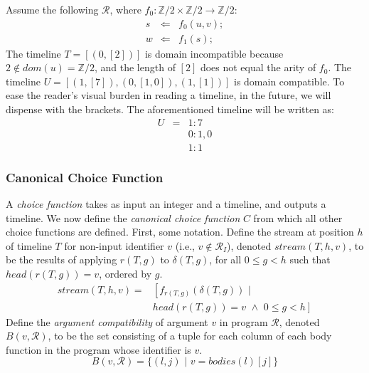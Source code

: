 \begin{example}
Assume the following $\mathcal{R}$, where $f_0 : \mathbb{Z}/2 \times \mathbb{Z}/2 \rightarrow \mathbb{Z}/2$:
\begin{eqnarray*}
  s &\Leftarrow& f_0(u, v); \\
  w &\Leftarrow& f_1(s);
\end{eqnarray*}
The timeline $T = [(0, [2])]$ is domain incompatible because $2 \not\in dom(u) = \mathbb{Z}/2$, and the length of $[2]$ does not equal the arity of $f_0$.  The timeline $U = [(1,[7]), (0,[1,0]), (1,[1])]$ is domain compatible.  To ease the reader's visual burden in reading a timeline, in the future, we will dispense with the brackets.  The aforementioned timeline will be written as:
\begin{eqnarray*}
U & = & 1 : 7 \\
 		&		& 0 : 1, 0 \\
		&		& 1 : 1
\end{eqnarray*}

\end{example}

\subsubsection{Canonical Choice Function}

A {\em choice function} takes as input an integer and a timeline, and outputs a timeline.  We now define the {\em canonical choice function} $C$ from which all other choice functions are defined.  First, some notation.  
Define the stream at position $h$ of timeline $T$ for non-input identifier $v$ (i.e., $v \not\in \mathcal{R}_I$), denoted $stream(T,h,v)$, to be the results of applying $r(T,g)$ to $\delta(T,g)$, for all $0 \leq g < h$ such that $head(r(T,g)) = v$, ordered by $g$.
\begin{equation*}
\begin{split}
stream(T,h,v) = & \left[ f_{r(T,g)}(\delta(T,g)) \,\, | \right. \\
& \left. head(r(T,g)) = v \,\, \land \,\, 0 \leq g < h \right]
\end{split}
\end{equation*}
Define the {\em argument compatibility} of argument $v$ in program $\mathcal{R}$, denoted $B(v,\mathcal{R})$, to be the set consisting of a tuple for each column of each body function in the program whose identifier is $v$.
$$
B(v,\mathcal{R}) = \{(l,j) \,\, | \,\, v = bodies(l)[j]\}
$$


